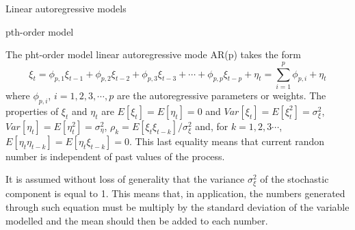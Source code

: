 \documentclass[8pt]{beamer}
\renewcommand{\emph}[1]{\textcolor{myorange}{#1}}
\begin{document}
\begin{frame}{Linear autoregressive models}
    \begin{block}{pth-order model}
    \end{block}
        The \alert{pht-order model linear autoregressive mode AR(p)} takes the form
        \begin{equation}
            \xi_t = \phi_{p,1} \xi_{t-1} + \phi_{p,2} \xi_{t-2} + \phi_{p,3} \xi_{t-3}+ \cdots + \phi_{p,p} \xi_{t-p} + \eta_t = \sum_{i=1}^p \phi_{p,i} + \eta_t
                  \label{e41}
    \end{equation}
        where $\phi_{p,i}$, $i=1,2,3,\cdots,p$ are the \emph{autoregressive parameters} or \emph{weights}. The properties of $\xi_t$ and $\eta_t$ are $E[\xi_t] = E[\eta_t]=0$ and $Var[\xi_t] = E[\xi_t^2] = \sigma_{\xi}^2$, $Var[\eta_t] = E[\eta_t^2] = \sigma_{\eta}^2$, $\rho_k = E[\xi_t \xi_{t-k}]/\sigma_{\xi}^2$ and, for $k=1,2,3 \cdots$, $E[\eta_t \eta_{t-k}] = E[\eta_t \xi_{t-k}]=0$. This last equality means that current randon number is independent of past values of the process.  

        It is assumed without loss of generality that the variance $\sigma_{\xi}^2$ of the \emph{stochastic component} is equal to 1. This means that, in application, the numbers generated through such equation must be multiply by the \emph{standard deviation} of the variable modelled and the \emph{mean} should then be added to each number.
\end{frame}
\end{document}
